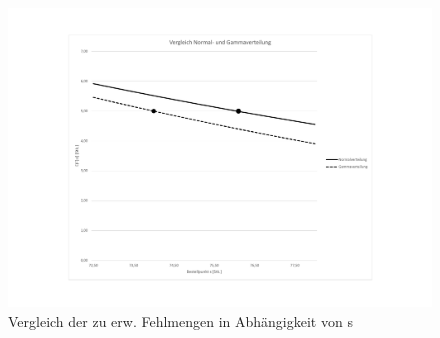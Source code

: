 \begin{figure}
	\centering
	\includegraphics[width=\textwidth,trim=4cm 1.5cm 4cm 1.5cm, clip=true]{./Bilder/VerteilungsfunktionenVerg.pdf}
	\caption{Vergleich der zu erw. Fehlmengen in Abhängigkeit von s}
	\label{img:vergleich}
\end{figure}